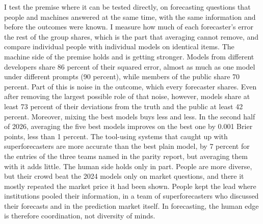 \documentclass[11pt,a4paper]{article}
\theoremstyle{definition}
\begin{document}
I test the premise where it can be tested directly, on forecasting questions that people and machines answered at the same time, with the same information and before the outcomes were known. I measure how much of each forecaster's error the rest of the group shares, which is the part that averaging cannot remove, and compare individual people with individual models on identical items. The machine side of the premise holds and is getting stronger. Models from different developers share 86 percent of their squared error, almost as much as one model under different prompts (90 percent), while members of the public share 70 percent. Part of this is noise in the outcome, which every forecaster shares. Even after removing the largest possible role of that noise, however, models share at least 73 percent of their deviations from the truth and the public at least 42 percent. Moreover, mixing the best models buys less and less. In the second half of 2026, averaging the five best models improves on the best one by 0.001 Brier points, less than 1 percent. The tool-using systems that caught up with superforecasters are more accurate than the best plain model, by 7 percent for the entries of the three teams named in the parity report, but averaging them with it adds little. The human side holds only in part. People are more diverse, but their crowd beat the 2024 models only on market questions, and there it mostly repeated the market price it had been shown. People kept the lead where institutions pooled their information, in a team of superforecasters who discussed their forecasts and in the prediction market itself. In forecasting, the human edge is therefore coordination, not diversity of minds.
\end{document}
